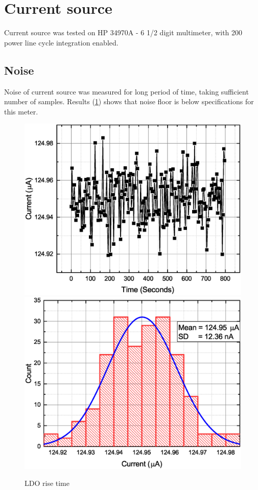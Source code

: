 \section{Current source}
    Current source was tested on HP 34970A - 6 1/2 digit multimeter, with 200 power line cycle integration enabled.

    \subsection{Noise}
        Noise of current source was measured for long period of time, taking sufficient number of samples. Results (\ref{Current_Stability}) shows that noise floor is below specifications for this meter.

        \begin{figure}[H]
            \centering
            \includegraphics[width=0.6\paperwidth]{img/07/current_time.eps}
            \includegraphics[width=0.6\paperwidth]{img/07/current_hist.eps}
            \caption{LDO rise time}
            \label{Current_Stability}
        \end{figure}

